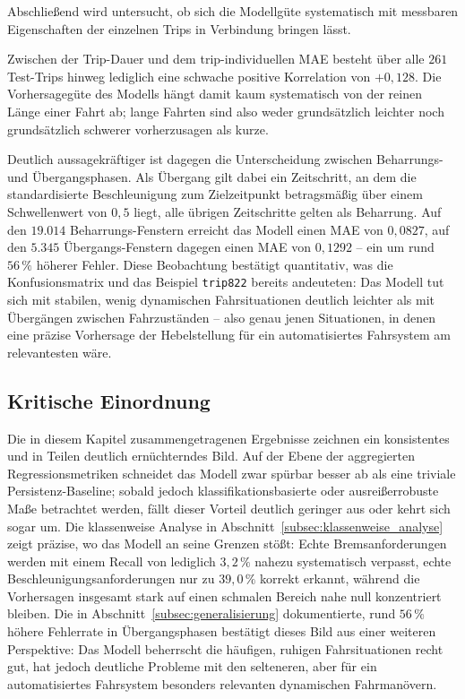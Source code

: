 Abschließend wird untersucht, ob sich die Modellgüte systematisch mit messbaren Eigenschaften der einzelnen Trips in Verbindung bringen lässt.

Zwischen der Trip-Dauer und dem trip-individuellen \gls{MAE} besteht über alle $261$ Test-Trips hinweg lediglich eine schwache positive Korrelation von $+0{,}128$. Die Vorhersagegüte des Modells hängt damit kaum systematisch von der reinen Länge einer Fahrt ab; lange Fahrten sind also weder grundsätzlich leichter noch grundsätzlich schwerer vorherzusagen als kurze.

Deutlich aussagekräftiger ist dagegen die Unterscheidung zwischen Beharrungs- und Übergangsphasen. Als Übergang gilt dabei ein Zeitschritt, an dem die standardisierte Beschleunigung zum Zielzeitpunkt betragsmäßig über einem Schwellenwert von $0{,}5$ liegt, alle übrigen Zeitschritte gelten als Beharrung. Auf den $19.014$ Beharrungs-Fenstern erreicht das Modell einen \gls{MAE} von $0{,}0827$, auf den $5.345$ Übergangs-Fenstern dagegen einen \gls{MAE} von $0{,}1292$ -- ein um rund $56\,\%$ höherer Fehler. Diese Beobachtung bestätigt quantitativ, was die Konfusionsmatrix und das Beispiel \texttt{trip822} bereits andeuteten: Das Modell tut sich mit stabilen, wenig dynamischen Fahrsituationen deutlich leichter als mit Übergängen zwischen Fahrzuständen -- also genau jenen Situationen, in denen eine präzise Vorhersage der Hebelstellung für ein automatisiertes Fahrsystem am relevantesten wäre.

\subsection{Kritische Einordnung}
\label{subsec:kritische_einordnung}

Die in diesem Kapitel zusammengetragenen Ergebnisse zeichnen ein konsistentes und in Teilen deutlich ernüchterndes Bild. Auf der Ebene der aggregierten Regressionsmetriken schneidet das Modell zwar spürbar besser ab als eine triviale Persistenz-Baseline; sobald jedoch klassifikationsbasierte oder ausreißerrobuste Maße betrachtet werden, fällt dieser Vorteil deutlich geringer aus oder kehrt sich sogar um. Die klassenweise Analyse in Abschnitt~\ref{subsec:klassenweise_analyse} zeigt präzise, wo das Modell an seine Grenzen stößt: Echte Bremsanforderungen werden mit einem Recall von lediglich $3{,}2\,\%$ nahezu systematisch verpasst, echte Beschleunigungsanforderungen nur zu $39{,}0\,\%$ korrekt erkannt, während die Vorhersagen insgesamt stark auf einen schmalen Bereich nahe null konzentriert bleiben. Die in Abschnitt~\ref{subsec:generalisierung} dokumentierte, rund $56\,\%$ höhere Fehlerrate in Übergangsphasen bestätigt dieses Bild aus einer weiteren Perspektive: Das Modell beherrscht die häufigen, ruhigen Fahrsituationen recht gut, hat jedoch deutliche Probleme mit den selteneren, aber für ein automatisiertes Fahrsystem besonders relevanten dynamischen Fahrmanövern.

